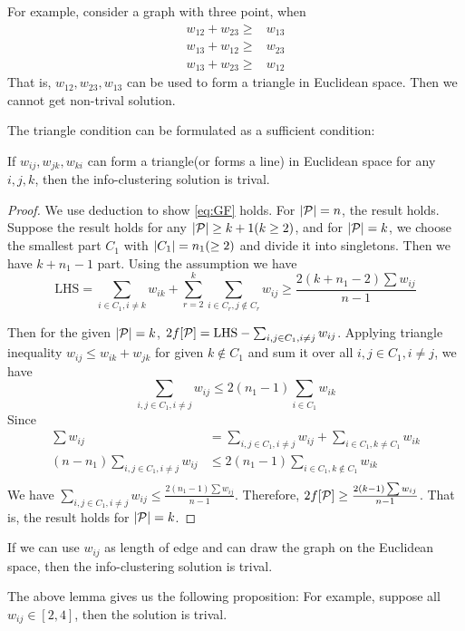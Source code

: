 \documentclass{article}
\begin{document}
For example, consider a graph with three point, when 
\begin{align*}
w_{12}+w_{23}\geq & w_{13} \\
w_{13}+w_{12}\geq & w_{23} \\
w_{13}+w_{23}\geq & w_{12} 
\end{align*}
That is, $w_{12}, w_{23}, w_{13}$ can be used to form a triangle in Euclidean space. Then we cannot get non-trival solution.

The triangle condition can be formulated as a sufficient condition:
\begin{lemma}
If $w_{ij}, w_{jk}, w_{ki}$ can form a triangle(or forms a line) in Euclidean space for any $i, j, k$, then the info-clustering solution is trival.
\end{lemma}
\begin{proof}
We use deduction to show  \eqref{eq:GF} holds. For $\abs{\P}=n$, the result holds. Suppose the result holds for any $\abs{\P} \geq k+1(k\geq 2)$, and for $\abs{\P}=k$, we choose the smallest part $C_1$ with $\abs{C_1}=n_1(\geq 2)$ and divide it into singletons. Then we have $k+n_1-1$ part. Using the assumption we have
$$
\mathrm{LHS} = \sum_{i\in C_1, i\neq k} w_{ik} + \sum_{r=2}^k \sum_{i \in C_r, j \not\in C_r} w_{ij}\geq \frac{2(k+n_1 -2)\sum w_{ij}}{n-1}
$$

Then for the given $\abs{\P}=k$, $2f[\P] =\mathrm{LHS} - \sum_{i,j\in C_1, i\neq j} w_{ij}$.
Applying triangle inequality $w_{ij} \leq w_{ik} + w_{jk}$ for given $k\not\in C_1$ and sum it over all $i, j \in C_1, i\neq j$, we have
$$
\sum_{i,j \in C_1, i\neq j} w_{ij} \leq 2(n_1-1)\sum_{i\in C_1} w_{ik}
$$
Since
\begin{align*}
\sum w_{ij} &= \sum_{i,j \in C_1, i\neq j} w_{ij} + \sum_{i\in C_1, k\neq C_1} w_{ik} \\
(n - n_1) \sum_{i,j \in C_1, i\neq j} w_{ij}& \leq 2(n_1 - 1) \sum_{i \in C_1, k \not\in C_1} w_{ik} \\
\end{align*}
We have $\sum_{i,j \in C_1, i\neq j} w_{ij} \leq \frac{2(n_1-1) \sum w_{ij}}{n-1}$. Therefore, 
$2f[\P] \geq \frac{2(k-1) \sum w_{ij}}{n-1}$. That is, the result holds for $\abs{\P}=k$.
\end{proof}
If we can use $w_{ij}$ as length of edge and can draw the graph on the Euclidean space, then the info-clustering solution is trival.

The above lemma gives us the following proposition:
For example, suppose all $w_{ij} \in [2,4]$, then the solution is trival.
\end{document}
